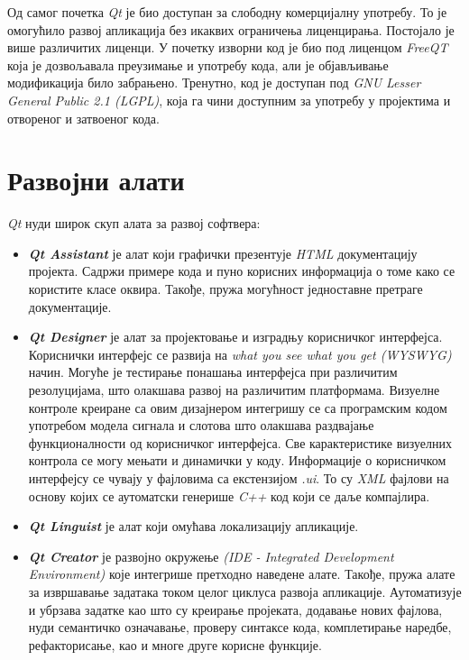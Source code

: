 \documentclass[11pt,a4paper,serbian,oneside]{book}
\begin{document}
Од самог почетка \textit{Qt} је био доступан за слободну комерцијалну употребу. То је омогућило развој апликација без икаквих ограничења лиценцирања. Постојало је више различитих лиценци. У почетку изворни код је био под лиценцом \textit{FreeQT} која је дозвољавала преузимање и употребу кода, али је објављивање модификација било забрањено. Тренутно, код је доступан под \textit{GNU Lesser General Public 2.1 (LGPL)}, која га чини доступним за употребу у пројектима и отвореног и затвоеног кода.

\section{Развојни алати}

\textit{Qt} нуди широк скуп алата за развој софтвера:
\begin{itemize}
  \item \textbf{\textit{Qt Assistant}} је алат који графички презентује \textit{HTML} документацију пројекта. Садржи примере кода и пуно корисних информација о томе како се користите класе оквира. Такође, пружа могућност једноставне претраге документације.

  \item \textbf{\textit{Qt Designer}} је алат за пројектовање и изградњу корисничког интерфејса. Кориснички интерфејс се развија на \textit{what you see what you get (WYSWYG)} начин. Могуће је тестирање понашања интерфејса при различитим резолуцијама, што олакшава развој на различитим платформама. Визуелне контроле креиране са овим дизајнером интегришу се са програмским кодом употребом модела сигнала и слотова што олакшава раздвајање функционалности од корисничког интерфејса. Све карактеристике визуелних контрола се могу мењати и динамички у коду. Информације о корисничком интерфејсу се чувају у фајловима са екстензијом \textit{.ui}. То су \textit{XML} фајлови на основу којих се аутоматски генерише \textit{C++} код који се даље компајлира.

  \item \textbf{\textit{Qt Linguist}} је алат који омућава локализацију апликације.

  \item \textbf{\textit{Qt Creator}} је развојно окружење \textit{(IDE - Integrated Development Environment)} које интегрише претходно наведене алате. Такође, пружа алате за извршавање задатака током целог циклуса развоја апликације. Аутоматизује и убрзава задатке као што су креирање пројеката, додавање нових фајлова, нуди семантичко означавање, проверу синтаксе кода, комплетирање наредбе, рефакторисање, као и многе друге корисне функције.
\end{itemize}
\end{document}
